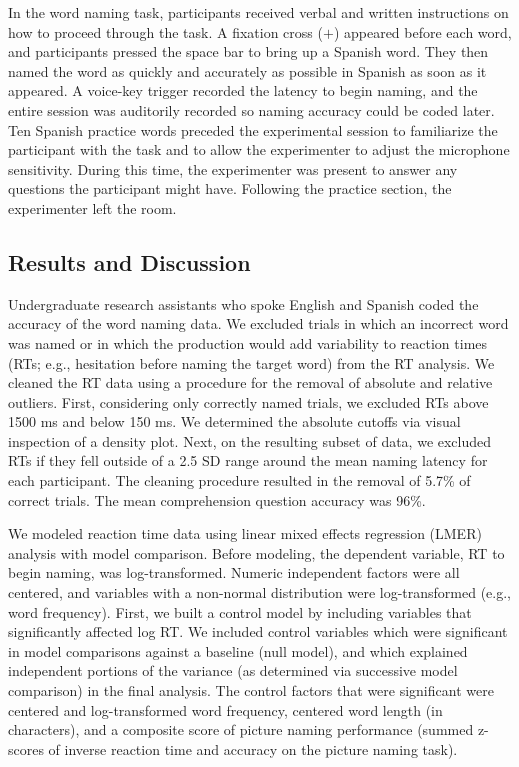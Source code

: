 In the word naming task, participants received verbal and written instructions on how to proceed through the task. A fixation cross ($+$) appeared before each word, and participants pressed the space bar to bring up a Spanish word. They then named the word as quickly and accurately as possible in Spanish as soon as it appeared. A voice-key trigger recorded the latency to begin naming, and the entire session was auditorily recorded so naming accuracy could be coded later. Ten Spanish practice words preceded the experimental session to familiarize the participant with the task and to allow the experimenter to adjust the microphone sensitivity. During this time, the experimenter was present to answer any questions the participant might have. Following the practice section, the experimenter left the room. 

\subsection{Results and Discussion}
\label{resultsanddiscussion}

Undergraduate research assistants who spoke English and Spanish coded the accuracy of the word naming data. We excluded trials in which an incorrect word was named or in which the production would add variability to reaction times (RTs; e.g., hesitation before naming the target word) from the RT analysis. We cleaned the RT data using a procedure for the removal of absolute and relative outliers. First, considering only correctly named trials, we excluded RTs above 1500 ms and below 150 ms. We determined the absolute cutoffs via visual inspection of a density plot. Next, on the resulting subset of data, we excluded RTs if they fell outside of a 2.5 SD range around the mean naming latency for each participant. The cleaning procedure resulted in the removal of 5.7\% of correct trials. The mean comprehension question accuracy was 96\%.

We modeled reaction time data using linear mixed effects regression (LMER) analysis with model comparison. Before modeling, the dependent variable, RT to begin naming, was log-transformed. Numeric independent factors were all centered, and variables with a non-normal distribution were log-transformed (e.g., word frequency). First, we built a control model by including variables that significantly affected log RT. We included control variables which were significant in model comparisons against a baseline (null model), and which explained independent portions of the variance (as determined via successive model comparison) in the final analysis. The control factors that were significant were centered and log-transformed word frequency, centered word length (in characters), and a composite score of picture naming performance (summed z-scores of inverse reaction time and accuracy on the picture naming task). 

